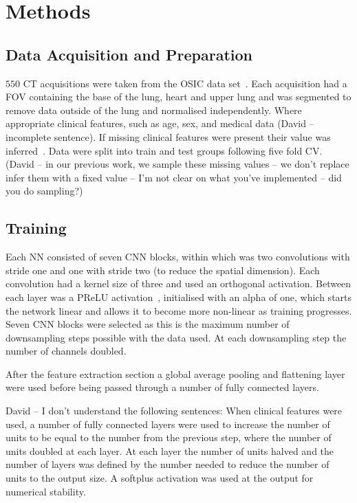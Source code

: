 
\section{Methods} \label{sec:methods}
    \subsection{Data Acquisition and Preparation} \label{sec:data_acquisition_and_preparation}
        $550$ \gls{CT} acquisitions were taken from the \gls{OSIC} data set~\cite{}. Each acquisition had a \gls{FOV} containing the base of the lung, heart and upper lung and was segmented to remove data outside of the lung and normalised independently. Where appropriate clinical features, such as age, sex, and medical data (David -- incomplete sentence). If missing clinical features were present their value was inferred~\cite{Shahin2022SurvivalData}. Data were split into train and test groups following five fold \gls{CV}. (David -- in our previous work, we sample these missing values  -- we don't replace infer them with a fixed value -- I'm not clear on what you've implemented -- did you do sampling?)

    \subsection{Training} \label{sec:training}
        Each \gls{NN} consisted of seven \gls{CNN} blocks, within which was two convolutions with stride one and one with stride two (to reduce the spatial dimension). Each convolution had a kernel size of three and used an orthogonal activation. Between each layer was a \gls{PReLU} activation~\cite{He2015DelvingClassification}, initialised with an alpha of one, which starts the network linear and allows it to become more non-linear as training progresses. Seven \gls{CNN} blocks were selected as this is the maximum number of downsampling steps possible with the data used. At each downsampling step the number of channels doubled.

        After the feature extraction section a global average pooling and flattening layer were used before being passed through a number of fully connected layers. 
        
        David -- I don't understand the following sentences:
        When clinical features were used, a number of fully connected layers were used to increase the number of units to be equal to the number from the previous step, where the number of units doubled at each layer. At each layer the number of units halved and the number of layers was defined by the number needed to reduce the number of units to the output size. A softplus activation was used at the output for numerical stability.

